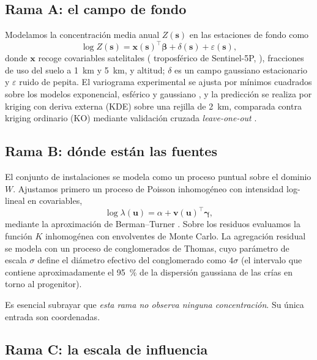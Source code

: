 \documentclass[10pt,twocolumn,a4paper]{article}
\begin{document}
\subsection{Rama A: el campo de fondo}

Modelamos la concentración media anual $Z(\mathbf{s})$ en las estaciones de
fondo como
\begin{equation}
\log Z(\mathbf{s}) = \mathbf{x}(\mathbf{s})^{\top}\boldsymbol{\beta}
                     + \delta(\mathbf{s}) + \varepsilon(\mathbf{s}),
\end{equation}
donde $\mathbf{x}$ recoge covariables satelitales ( troposférico de
Sentinel-5P, \citealp{veefkind2012}), fracciones de uso del suelo a
\SI{1}{\kilo\metre} y \SI{5}{\kilo\metre}, y altitud; $\delta$ es un campo
gaussiano estacionario y $\varepsilon$ ruido de pepita. El variograma
experimental se ajusta por mínimos cuadrados sobre los modelos exponencial,
esférico y gaussiano \citep{cressie1993}, y la predicción se realiza por
kriging con deriva externa (KDE) sobre una rejilla de \SI{2}{\kilo\metre},
comparada contra kriging ordinario (KO) mediante validación cruzada
\emph{leave-one-out} \citep{pebesma2004}.

\subsection{Rama B: dónde están las fuentes}

El conjunto de instalaciones se modela como un proceso puntual sobre el
dominio $W$. Ajustamos primero un proceso de Poisson inhomogéneo con
intensidad log-lineal en covariables,
\begin{equation}
\log \lambda(\mathbf{u}) = \alpha + \mathbf{v}(\mathbf{u})^{\top}\boldsymbol{\gamma},
\end{equation}
mediante la aproximación de Berman--Turner \citep{baddeley2015}. Sobre los
residuos evaluamos la función $K$ inhomogénea \citep{baddeley2000} con
envolventes de Monte Carlo. La agregación residual se modela con un proceso de
conglomerados de Thomas, cuyo parámetro de escala $\sigma$ define el diámetro
efectivo del conglomerado como $4\sigma$ (el intervalo que contiene
aproximadamente el \SI{95}{\percent} de la dispersión gaussiana de las crías
en torno al progenitor).

Es esencial subrayar que \emph{esta rama no observa ninguna concentración}.
Su única entrada son coordenadas.

\subsection{Rama C: la escala de influencia}
\end{document}
